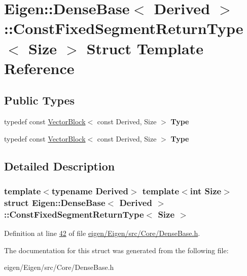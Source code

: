 \hypertarget{struct_eigen_1_1_dense_base_1_1_const_fixed_segment_return_type}{}\section{Eigen\+:\+:Dense\+Base$<$ Derived $>$\+:\+:Const\+Fixed\+Segment\+Return\+Type$<$ Size $>$ Struct Template Reference}
\label{struct_eigen_1_1_dense_base_1_1_const_fixed_segment_return_type}
\subsection*{Public Types}
\begin{DoxyCompactItemize}
\item 
\mbox{\label{struct_eigen_1_1_dense_base_1_1_const_fixed_segment_return_type_a8ff59e0bd4c81ec0f2f2e608fbfedfef}} 
typedef const \hyperlink{group___core___module_class_eigen_1_1_vector_block}{Vector\+Block}$<$ const Derived, Size $>$ {\bfseries Type}
\item 
\mbox{\label{struct_eigen_1_1_dense_base_1_1_const_fixed_segment_return_type_a8ff59e0bd4c81ec0f2f2e608fbfedfef}} 
typedef const \hyperlink{group___core___module_class_eigen_1_1_vector_block}{Vector\+Block}$<$ const Derived, Size $>$ {\bfseries Type}
\end{DoxyCompactItemize}


\subsection{Detailed Description}
\subsubsection*{template$<$typename Derived$>$\newline
template$<$int Size$>$\newline
struct Eigen\+::\+Dense\+Base$<$ Derived $>$\+::\+Const\+Fixed\+Segment\+Return\+Type$<$ Size $>$}



Definition at line \hyperlink{eigen_2_eigen_2src_2_core_2_dense_base_8h_source_l00042}{42} of file \hyperlink{eigen_2_eigen_2src_2_core_2_dense_base_8h_source}{eigen/\+Eigen/src/\+Core/\+Dense\+Base.\+h}.



The documentation for this struct was generated from the following file\+:\begin{DoxyCompactItemize}
\item 
eigen/\+Eigen/src/\+Core/\+Dense\+Base.\+h\end{DoxyCompactItemize}
